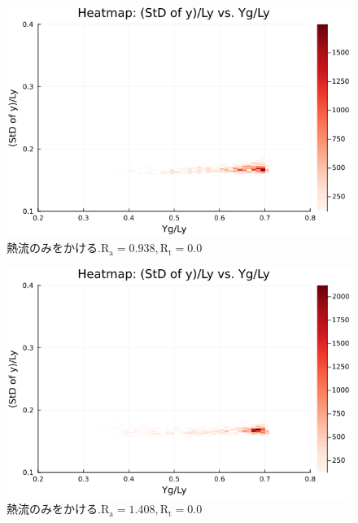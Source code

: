 \begin{figure}[H]
  \centering
  \includegraphics[scale=0.6]{image/g0_heat/2024-01-15T14:07:34.622_mapg0_chiinf_Ay50_rho0.4_T0.43_dT0.04_Rd0.0_Rt0.0_Ra0.938769_g0_run4.0e7.png}
  \caption{$熱流のみをかける. \text{R}_\text{a}=0.938,\text{R}_\text{t}=0.0$}
  \label{}
\end{figure}

\begin{figure}[H]
  \centering
  \includegraphics[scale=0.6]{image/g0_heat/2024-01-15T14:07:34.689_mapg0_chiinf_Ay50_rho0.4_T0.43_dT0.04_Rd0.0_Rt0.0_Ra1.4081535_g0_run4.0e7.png}
  \caption{$熱流のみをかける. \text{R}_\text{a}=1.408,\text{R}_\text{t}=0.0$}
  \label{}
\end{figure}

